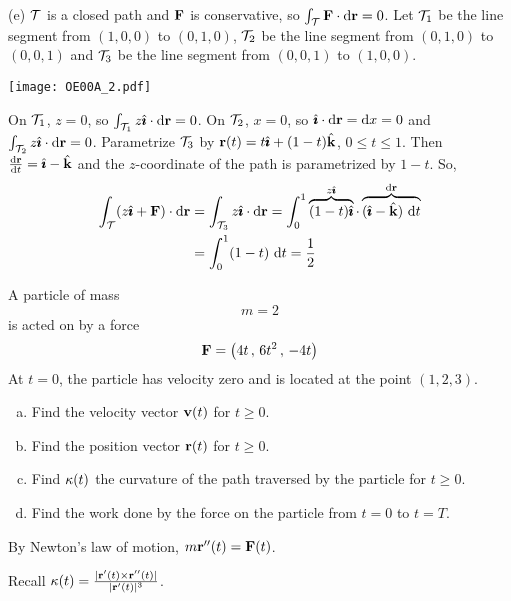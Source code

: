 \begin{solution}
(e) 
$\mathcal{T}$ is a closed path and $\mathbf{F}$ is conservative, so 
$\int_{\mathcal{T}}\mathbf{F}\cdot \mathrm{d}\mathbf{r}=0$. Let $\mathcal{T}_1$ be the line segment from 
$(1,0,0)$ to $(0,1,0)$,  $\mathcal{T}_2$ be the line segment from 
$(0,1,0)$ to $(0,0,1)$  and $\mathcal{T}_3$ be the line segment from $(0,0,1)$ to
$(1,0,0)$. 

\begin{center}
   \texttt{[image: OE00A\_2.pdf]}
\end{center}


On $\mathcal{T}_1$, $z=0$, so $\int_{\mathcal{T}_1}z\hat{\pmb{\imath}}\cdot \mathrm{d}\mathbf{r}=0$. On $\mathcal{T}_2$,
$x=0$, so $\hat{\pmb{\imath}}\cdot \mathrm{d}\mathbf{r}=\mathrm{d}x=0$ and  $\int_{\mathcal{T}_2}z\hat{\pmb{\imath}}\cdot \mathrm{d}\mathbf{r}=0$. Parametrize
$\mathcal{T}_3$ by $\mathbf{r}(t)=t\hat{\pmb{\imath}}+(1-t)\hat{\mathbf{k}}$, $0\le t\le 1$. Then 
$\diff{\vr}{t}=\hi-\hk$ and the $z$-coordinate of the path is parametrized by $1-t$. So,
\begin{align*}
\int_\cT(z\hi+\vF)\cdot \dee{\vr}
&=\int_{\cT_3}z\hi\cdot \dee{\vr}=\int_{0}^1\overbrace{(1-t)\hi}^{z\hi}\cdot\overbrace{(\hi-\hk)\ \dee{t}}^{\dee{\vr}}\\
&=\int_0^1 (1-t) \ \dee{t}
=\frac{1}{2}
\end{align*}
 

\end{solution}

\begin{question}[M317 2017D] %
A particle of mass
\begin{equation*}
m=2
\end{equation*}
is acted on by  a force
\begin{equation*}
\mathbf{F} = \big(4t\,,\,6t^2\,,\,-4t\big)
\end{equation*}
At $t=0$, the particle has velocity zero and is located at the
point $(1,2,3)$.
\begin{enumerate}[(a)]
\item
Find the velocity vector $\mathbf{v}(t)$ for $t\ge 0$.
\item
Find the position vector $\mathbf{r}(t)$ for $t\ge 0$.
\item
Find $\kappa(t)$ the curvature of the path traversed by the particle for $t\ge 0$.
\item
Find the work done by the force on the particle from $t=0$ to $t=T$.
\end{enumerate}
\end{question}

\begin{hint}
By Newton's law of motion, $m\mathbf{r}''(t)=\mathbf{F}(t)$. 

Recall $\kappa(t)  = \frac{|\mathbf{r}'(t)\times\mathbf{r}''(t)|}{|\mathbf{r}'(t)|^3}$.

\end{hint}

